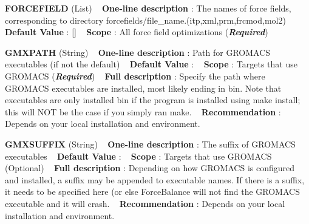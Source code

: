 \begin{DoxyItemize}
\item {\bfseries  F\+O\+R\+C\+E\+F\+I\+E\+LD } (List) ~\newline
{\bfseries  One-\/line description }\+: The names of force fields, corresponding to directory forcefields/file\+\_\+name.(itp,xml,prm,frcmod,mol2) ~\newline
{\bfseries  Default Value }\+: \mbox{[}\mbox{]} ~\newline
{\bfseries  Scope }\+: All force field optimizations ({\bfseries {\itshape Required}})\end{DoxyItemize}
\begin{DoxyItemize}
\item {\bfseries  G\+M\+X\+P\+A\+TH } (String) ~\newline
{\bfseries  One-\/line description }\+: Path for G\+R\+O\+M\+A\+CS executables (if not the default) ~\newline
{\bfseries  Default Value }\+: ~\newline
{\bfseries  Scope }\+: Targets that use G\+R\+O\+M\+A\+CS ({\bfseries {\itshape Required}}) ~\newline
{\bfseries  Full description }\+: Specify the path where G\+R\+O\+M\+A\+CS executables are installed, most likely ending in \textquotesingle{}bin\textquotesingle{}. Note that executables are only installed \textquotesingle{}bin\textquotesingle{} if the program is installed using \textquotesingle{}make install\textquotesingle{}; this will N\+OT be the case if you simply ran \textquotesingle{}make\textquotesingle{}. ~\newline
{\bfseries  Recommendation }\+: Depends on your local installation and environment.\end{DoxyItemize}
\begin{DoxyItemize}
\item {\bfseries  G\+M\+X\+S\+U\+F\+F\+IX } (String) ~\newline
{\bfseries  One-\/line description }\+: The suffix of G\+R\+O\+M\+A\+CS executables ~\newline
{\bfseries  Default Value }\+: ~\newline
{\bfseries  Scope }\+: Targets that use G\+R\+O\+M\+A\+CS (Optional) ~\newline
{\bfseries  Full description }\+: Depending on how G\+R\+O\+M\+A\+CS is configured and installed, a suffix may be appended to executable names. If there is a suffix, it needs to be specified here (or else Force\+Balance will not find the G\+R\+O\+M\+A\+CS executable and it will crash. ~\newline
{\bfseries  Recommendation }\+: Depends on your local installation and environment.\end{DoxyItemize}
